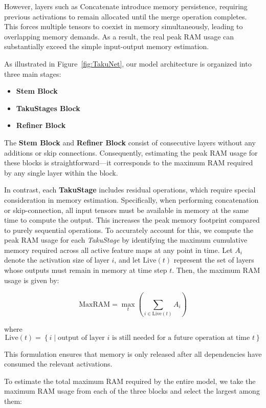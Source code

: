 However, layers such as Concatenate introduce memory persistence, requiring previous activations to remain allocated until the merge operation completes. This forces multiple tensors to coexist in memory simultaneously, leading to overlapping memory demands. As a result, the real peak RAM usage can substantially exceed the simple input-output memory estimation.




As illustrated in Figure~\ref{fig:TakuNet}, our model architecture is organized into three main stages:

\begin{itemize}
    \item \textbf{Stem Block}
    \item \textbf{TakuStages Block}
    \item \textbf{Refiner Block}
\end{itemize}

The \textbf{Stem Block} and \textbf{Refiner Block} consist of consecutive layers without any additions or skip connections. Consequently, estimating the peak RAM usage for these blocks is straightforward—it corresponds to the maximum RAM required by any single layer within the block.

In contrast, each \textbf{TakuStage} includes residual operations, which require special consideration in memory estimation. Specifically, when performing concatenation or skip-connection, all input tensors must be available in memory at the same time to compute the output. This increases the peak memory footprint compared to purely sequential operations. To accurately account for this, we compute the peak RAM usage for each \textit{TakuStage} by identifying the maximum cumulative memory required across all active feature maps at any point in time. Let \( A_i \) denote the activation size of layer \( i \), and let \( \text{Live}(t) \) represent the set of layers whose outputs must remain in memory at time step \( t \). Then, the maximum RAM usage is given by:

\[
\text{MaxRAM} = \max_{t} \left( \sum_{i \in \text{Live}(t)} A_i \right)
\]

where
\[
\text{Live}(t) = \left\{ i \mid \text{output of layer } i \text{ is still needed for a future operation at time } t \right\}
\]

This formulation ensures that memory is only released after all dependencies have consumed the relevant activations.


To estimate the total maximum RAM required by the entire model, we take the maximum RAM usage from each of the three blocks and select the largest among them:

